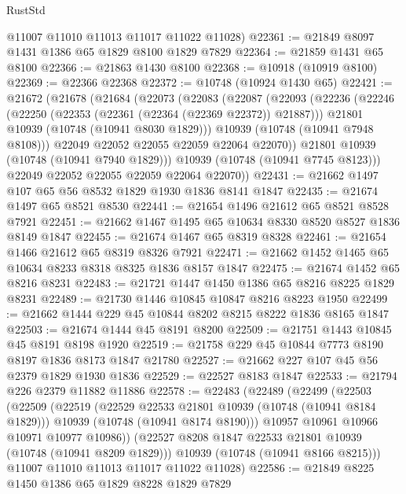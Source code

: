 \begin{lexlean}{RustStd}
\begin{coremodule}
{\begin{coremodule}
{{{{{      @11007
      @11010
      @11013
      @11017
      @11022
      @11028)
@22361 := @21849 @8097 @1431 @1386 @65 @1829 @8100 @1829 @7829
@22364 := @21859 @1431 @65 @8100
@22366 := @21863 @1430 @8100
@22368 := @10918 (@10919 @8100)
@22369 := @22366 @22368
@22372 := @10748 (@10924 @1430 @65)
@22421 := @21672
    (@21678
      (@21684
        (@22073
          (@22083
            (@22087
              (@22093
                (@22236
                  (@22246
                    (@22250 (@22353 (@22361 (@22364 (@22369 @22372)) @21887)))
                    @21801
                    @10939
                    (@10748 (@10941 @8030 @1829)))
                  @10939
                  (@10748 (@10941 @7948 @8108)))
                @22049
                @22052
                @22055
                @22059
                @22064
                @22070))
            @21801
            @10939
            (@10748 (@10941 @7940 @1829)))
          @10939
          (@10748 (@10941 @7745 @8123)))
        @22049
        @22052
        @22055
        @22059
        @22064
        @22070))
@22431 := @21662 @1497 @107 @65 @56 @8532 @1829 @1930 @1836 @8141 @1847
@22435 := @21674 @1497 @65 @8521 @8530
@22441 := @21654 @1496 @21612 @65 @8521 @8528 @7921
@22451 := @21662 @1467 @1495 @65 @10634 @8330 @8520 @8527 @1836 @8149 @1847
@22455 := @21674 @1467 @65 @8319 @8328
@22461 := @21654 @1466 @21612 @65 @8319 @8326 @7921
@22471 := @21662 @1452 @1465 @65 @10634 @8233 @8318 @8325 @1836 @8157 @1847
@22475 := @21674 @1452 @65 @8216 @8231
@22483 := @21721 @1447 @1450 @1386 @65 @8216 @8225 @1829 @8231
@22489 := @21730 @1446 @10845 @10847 @8216 @8223 @1950
@22499 := @21662 @1444 @229 @45 @10844 @8202 @8215 @8222 @1836 @8165 @1847
@22503 := @21674 @1444 @45 @8191 @8200
@22509 := @21751 @1443 @10845 @45 @8191 @8198 @1920
@22519 := @21758 @229 @45 @10844 @7773 @8190 @8197 @1836 @8173 @1847 @21780
@22527 := @21662 @227 @107 @45 @56 @2379 @1829 @1930 @1836
@22529 := @22527 @8183 @1847
@22533 := @21794 @226 @2379 @11882 @11886
@22578 := @22483
    (@22489
      (@22499
        (@22503
          (@22509
            (@22519
              (@22529 @22533 @21801 @10939 (@10748 (@10941 @8184 @1829)))
              @10939
              (@10748 (@10941 @8174 @8190)))
            @10957
            @10961
            @10966
            @10971
            @10977
            @10986))
        (@22527 @8208 @1847 @22533 @21801 @10939 (@10748 (@10941 @8209 @1829)))
        @10939
        (@10748 (@10941 @8166 @8215)))
      @11007
      @11010
      @11013
      @11017
      @11022
      @11028)
@22586 := @21849 @8225 @1450 @1386 @65 @1829 @8228 @1829 @7829
}}}}}
\end{coremodule}}
\end{coremodule}
\end{lexlean}
